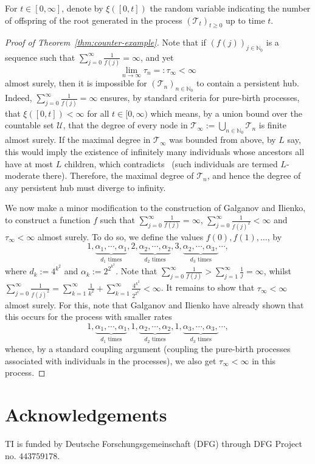 \documentclass[12pt]{article}
\theoremstyle{definition}
\begin{document}
For $t \in [0, \infty]$, denote by $\xi([0,t])$ the random variable indicating the number of offspring of the root generated in the process $(\mathscr{T}_{t})_{t \geq 0}$ up to time $t$. 

\begin{proof}[Proof of Theorem~\ref{thm:counter-example}]
    Note that if $(f(j))_{j \in \mathbb{N}_0}$ is a sequence such that $\sum_{j=0}^{\infty} \frac{1}{f(j)} = \infty$, and yet \[\lim_{n \to \infty} \tau_{n} =: \tau_{\infty} < \infty\] almost surely, then it is impossible for $(\mathcal{T}_{n})_{n \in \mathbb{N}_0}$ to contain a persistent hub. Indeed, $\sum_{j=0}^{\infty} \frac{1}{f(j)} = \infty$ ensures, by standard criteria for pure-birth processes, that $\xi([0,t]) < \infty$ for all $t \in [0, \infty)$ which means, by a union bound over the countable set $\mathcal{U}$, that the degree of every node in $\mathcal{T}_{\infty}:= \bigcup_{n \in \mathbb{N}_0} \mathcal{T}_n$ is finite almost surely. If the maximal degree in $\mathcal{T}_{\infty}$ was bounded from above, by $L$ say, this would imply the existence of infinitely many individuals whose ancestors all have at most $L$ children, which contradicts~\cite[Proposition~4.4]{inhom-sup-pref-attach} (such individuals are termed $L$-moderate there). Therefore, the maximal degree of $\mathcal{T}_{n}$, and hence the degree of any persistent hub must diverge to infinity.  
    
    We now make a minor modification to the construction of Galganov and Ilienko, to construct a function $f$ such that
    $\sum_{j=0}^{\infty} \frac{1}{f(j)} = \infty$, $\sum_{j=0}^{\infty} \frac{1}{f(j)^2} < \infty$ and $\tau_{\infty} < \infty$ almost surely. To do so, we define the values $f(0), f(1), \ldots$, by 
    \[
    1, \underbrace{\alpha_{1}, \cdots, \alpha_1}_{d_1 \text{ times}}, 2, \underbrace{\alpha_{2}, \cdots, \alpha_2}_{d_2 \text{ times}}, 3, \underbrace{\alpha_{2}, \cdots, \alpha_3, }_{d_3 \text{ times}} \cdots, 
    \]
    where $d_{k} := 4^{k^2}$ and $\alpha_{k} := 2^{2^{k^3}}$. Note that $\sum_{j=0}^{\infty} \frac{1}{f(j)} > \sum_{j=1}^{\infty} \frac{1}{j} = \infty$, whilst $\sum_{j=0}^{\infty} \frac{1}{f(j)^{2}} = \sum_{k=1}^{\infty} \frac{1}{k^2} + \sum_{k=1}^{\infty} \frac{4^{k^2}}{2^{2^{k^3}}} < \infty$. 
    It remains to show that $\tau_{\infty} < \infty$ almost surely. For this, note that Galganov and Ilienko have already shown that this occurs for the process with smaller rates 
    \[
    1, \underbrace{\alpha_{1}, \cdots, \alpha_1}_{d_1 \text{ times}}, 1, \underbrace{\alpha_{2}, \cdots, \alpha_2}_{d_2 \text{ times}}, 1, \underbrace{\alpha_{3}, \cdots, \alpha_3, }_{d_3 \text{ times}} \cdots, 
    \]
    whence, by a standard coupling argument (coupling the pure-birth processes associated with individuals in the processes), we also get $\tau_{\infty} < \infty$ in this process. 
\end{proof}


    
\section*{Acknowledgements}
TI is funded by Deutsche Forschungsgemeinschaft (DFG) through DFG Project no. $443759178$. 




\end{document}
